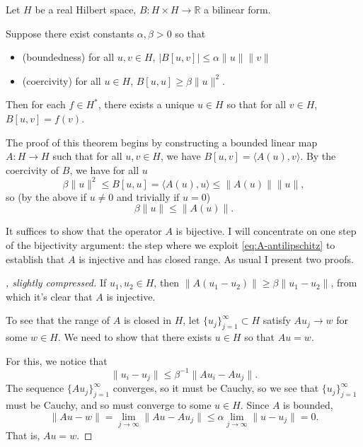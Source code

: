 \documentclass[runningheads]{llncs}
\begin{document}
Let $H$ be a real Hilbert space, $B : H \times H \to \mathbb{R}$ a bilinear form.

\begin{theorem} Suppose there exist constants $\alpha, \beta > 0$ so that
\begin{itemize}
  \item (boundedness) for all $u,v\in H$, $|B[u, v]| \le \alpha \|u\| \|v\|$
  \item (coercivity) for all $u \in H$, $B[u, u]\geq \beta\|u\|^2$.
\end{itemize}
Then for each $f \in H^*$, there exists a unique $u \in H$ so that
for all $v \in H$, $B[u, v] = f(v)$.
\end{theorem}


The proof of this theorem
begins by constructing a bounded linear map $A:H\to H$ such that for all $u,v\in H$,
we have $B[u,v]=\langle A(u),v\rangle$.
By the coercivity of $B$, we have for all $u$
\[
\beta\|u\|^2\le B[u, u]=\langle A(u), u\rangle \le \|A(u)\| \|u\|,
\]
so (by the above if $u\ne 0$ and trivially if $u = 0$)
\begin{equation}
  \beta\|u\|\le \|A(u)\|.\label{eq:A-antilipschitz}
\end{equation}

It suffices to show that the operator $A$ is bijective.
I will concentrate on one step of the bijectivity argument:
the step where we exploit \cref{eq:A-antilipschitz} to establish that $A$
is injective and has closed range.
As usual I present two proofs.

\begin{proof}[\cite{How20}, slightly compressed]
If $u_1, u_2 \in H$,
then $\lVert A(u_1 - u_2)\rVert \geq \beta \lVert u_1 - u_2\rVert$,
from which it's clear that $A$ is injective.

To see that the range of $A$ is closed in $H$,
let $\{u_j\}_{j=1}^\infty\subset H$ satisfy $Au_j \to w$ for some $w \in H$.
We need to show that there exists $u \in H$
so that $Au = w$.

For this, we notice that
\[
  \lVert u_i - u_j \rVert \le \beta^{-1} \lVert Au_i - Au_j \rVert.
\]
The sequence $\{Au_j\}_{j=1}^\infty$ converges, so it must be Cauchy,
so we see that $\{u_j\}_{j=1}^\infty$ must be Cauchy,
and so must converge to some $u \in H$.
Since $A$ is bounded,
\[
\lVert Au - w \rVert 
= \lim_{j\to\infty} \lVert Au - Au_j \rVert 
\le \alpha \lim_{j\to \infty} \lVert u - u_j\rVert
= 0.
\]
That is, $Au = w$. 
\end{proof}
\end{document}
